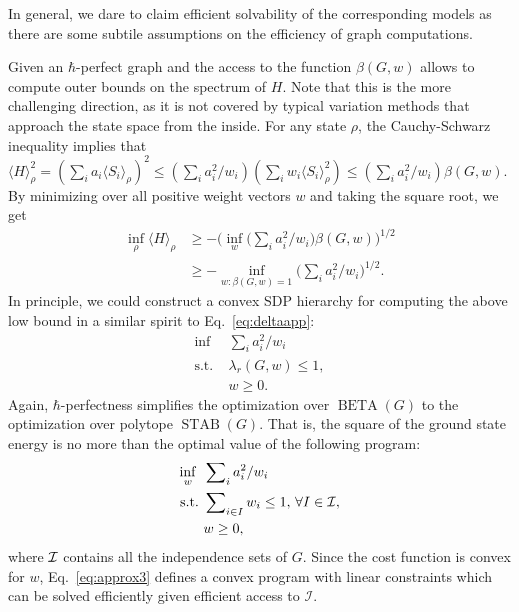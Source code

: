 \documentclass[
12pt,
prx,
aps,
reprint,
a4paper,
longbibliograph,
nofootinbib,
nobibnotes,
superscriptaddress
]{revtex4-2}
\theoremstyle{definition}
\def\stab{\operatorname{STAB}}
\def\be{\operatorname{BETA}}
\begin{document}
In general, we dare to claim efficient solvability of the corresponding models as there are some subtile assumptions on the efficiency of graph computations. 


Given an $\hbar$-perfect graph and the access to the function 
$\beta(G,w)$ allows to compute outer bounds on the spectrum of $H$. Note that this is the  more challenging direction, as it is not covered by typical variation methods that approach the state space from the inside.  
For any state $\rho$, the Cauchy-Schwarz inequality implies that
$\langle H\rangle^2_\rho = (\sum_i a_i \langle S_i\rangle_\rho)^2 \le \left(\sum_i a_i^2/w_i \right)\left(\sum_i w_i \langle S_i\rangle^2_\rho\right) \le \left(\sum_i a_i^2/w_i\right) \beta(G,w)$. By minimizing over all positive weight vectors $w$ and taking the square root, we get
\begin{equation}
\begin{aligned}
    \label{eq:approx}
   \inf_\rho \langle H \rangle_\rho  &\geq -\Big(\inf_w  \Big( \sum\nolimits_i a_i^2/w_i\Big)\beta(G,w)\Big)^{1/2}\\
				     &\geq -\inf_{w: \beta(G,w)=1}  \Big( \sum\nolimits_i a_i^2/w_i\Big)^{1/2}.
\end{aligned}
\end{equation}
In principle, we could construct a convex SDP hierarchy for computing the above low bound in a similar spirit to Eq.~\eqref{eq:deltaapp}:
\begin{align}\label{gs-sdp}
\inf\,\,\,&\sum_i a_i^2/w_i\nonumber\\
    \mathrm{s.t.}\ & \lambda_r(G,w) \le 1,\nonumber\\
	     & w\ge 0.
\end{align}
Again, $\hbar$-perfectness simplifies the optimization over $\be(G)$ to the optimization over polytope $\stab(G)$. %
That is, the square of the ground state energy is no more than the optimal value of the following program:
\begin{align}
    \label{eq:approx3}
    \inf_w \,\,\,  &\sum\nolimits_i a_i^2/w_i\nonumber\\
    \mathrm{s.t.}\ & \sum\nolimits_{i\in I} w_i \le 1,\, \forall I \in {\cal I},\nonumber\\
    & w \ge 0,
\end{align}
where ${\cal I}$ contains all the independence sets of $G$. Since the cost function is convex for $w$, Eq.~\eqref{eq:approx3} defines a convex program with linear constraints which can be solved efficiently given efficient access to $\mathcal{I}$.
\end{document}
